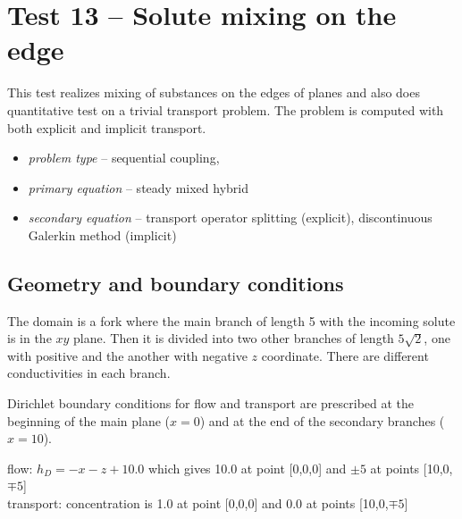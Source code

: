 
\section{Test 13 -- Solute mixing on the edge}
This test realizes mixing of substances on the edges of planes and also does quantitative test on a trivial transport problem. The problem is computed with both explicit and implicit transport.

\begin{itemize} 
    \item \emph{problem type} -- sequential coupling, 
    \item \emph{primary equation} -- steady mixed hybrid
    \item \emph{secondary equation} -- transport operator splitting (explicit), discontinuous Galerkin method (implicit)
  \end{itemize}

\subsection*{Geometry and boundary conditions}
The domain is a fork where the main branch of length 5 with the incoming solute is in the $xy$ plane. Then it is divided into two other branches of length $5\sqrt{2}$, one with positive and the another with negative $z$ coordinate. There are different conductivities in each branch.

Dirichlet boundary conditions for flow and transport are prescribed at the beginning of the main plane ($x=0$) and at the end of the secondary branches ($x=10$).

flow: $h_D=-x-z+10.0$ which gives 10.0 at point [0,0,0] and $\pm5$ at points [10,0,$\mp5$]\\
transport: concentration is 1.0 at point [0,0,0] and 0.0 at points [10,0,$\mp5$]

